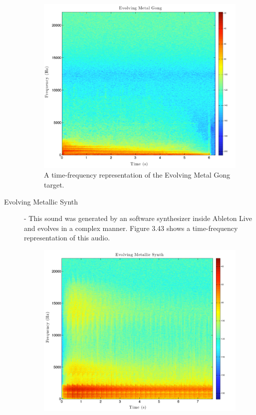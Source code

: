 \documentclass[a4paper,12pt]{report} 	%
\numberwithin{figure}{chapter}
\numberwithin{table}{chapter}
\numberwithin{equation}{chapter}
\begin{document}
\begin{flushleft}
\begin{description}
\begin{figure}[h!]
\begin{center}
\includegraphics[scale=0.35,width=\linewidth]{EvolvingMetalGong}
\caption[Evolving Metal Gong Time-Frequency Representation]{A time-frequency representation of the Evolving Metal Gong target.}
\end{center}
\end{figure}
\item[Evolving Metallic Synth] - This sound was generated by an software synthesizer inside Ableton Live and evolves in a complex manner. Figure 3.43 shows a time-frequency representation of this audio.
\begin{figure}[h!]
\begin{center}
\includegraphics[scale=0.35,width=\linewidth]{EvolvingMetallicSynth}

\end{center}
\end{figure}
\end{description}
\end{flushleft}
\end{document}

